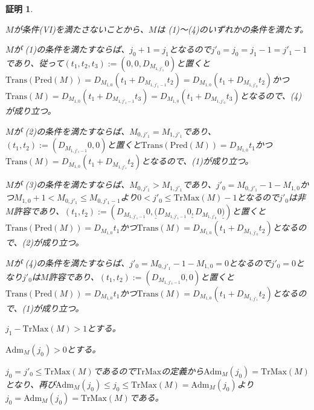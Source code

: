 \documentclass[dvipdfmx,uplatex]{jsarticle}
\theoremstyle{customnonumberbreakfortheorem}
\theoremstyle{customnonumberbreakforproof}
\newtheorem{hideableproof}{証明}
\begin{document}
\begin{hideableproof}
\begin{indented}
\begin{indented}
			\item \(M\)が条件(VI)を満たさないことから、\(M\)は (1)～(4)のいずれかの条件を満たす。
			\item \(M\)が (1)の条件を満たすならば、\(j_0+1 = j_1\)となるので\(j'_0 = j_0 = j_1-1 = j'_1-1\)であり、従って\((t_1,t_2,t_3) := (0,0,D_{M_{1,j'_1}} 0)\)と置くと\(\textrm{Trans}(\textrm{Pred}(M)) = D_{M_{1,0}}(t_1 + D_{M_{1,j'_1-1}} t_2) = D_{M_{1,0}}(t_1 + D_{M_{1,j'_0}} t_2)\)かつ\(\textrm{Trans}(M) = D_{M_{1,0}}(t_1 + D_{M_{1,j'_1-1}} t_3) = D_{M_{1,0}}(t_1 + D_{M_{1,j'_0}} t_3)\)となるので、(4)が成り立つ。
			\item \(M\)が (2)の条件を満たすならば、\(M_{0,j'_1} = M_{1,j'_1}\)であり、\((t_1,t_2) := (D_{M_{1,j'_1-1}} 0, 0)\)と置くと\(\textrm{Trans}(\textrm{Pred}(M)) = D_{M_{1,0}} t_1\)かつ\(\textrm{Trans}(M) = D_{M_{1,0}}(t_1 + D_{M_{1,j'_1}} t_2)\)となるので、(1)が成り立つ。
			\item \(M\)が (3)の条件を満たすならば、\(M_{0,j'_1} > M_{1,j'_1}\)であり、\(j'_0 = M_{0,j'_1}-1-M_{1,0}\)かつ\(M_{1,0}+1 < M_{0,j'_1} \leq M_{0,j'_1-1}\)より\(0 < j'_0 \leq \textrm{TrMax}(M)-1\)となるので\(j'_0\)は非\(M\)許容であり、\((t_1,t_2) := (D_{M_{1,j'_1-1}} 0, \underline{(} D_{M_{1,j'_1-1}} 0 \underline{,} D_{M_{1,j'_0}} 0 \underline{)})\)と置くと\(\textrm{Trans}(\textrm{Pred}(M)) = D_{M_{1,0}} t_1\)かつ\(\textrm{Trans}(M) = D_{M_{1,0}}(t_1 + D_{M_{1,j'_0}} t_2)\)となるので、(2)が成り立つ。
			\item \(M\)が (4)の条件を満たすならば、\(j'_0 = M_{0,j'_1}-1-M_{1,0} = 0\)となるので\(j'_0 = 0\)となり\(j'_0\)は\(M\)許容であり、\((t_1,t_2) := (D_{M_{1,j'_1-1}} 0, 0)\)と置くと\(\textrm{Trans}(\textrm{Pred}(M)) = D_{M_{1,0}} t_1\)かつ\(\textrm{Trans}(M) = D_{M_{1,0}}(t_1 + D_{M_{1,j'_1}} t_2)\)となるので、(1)が成り立つ。
		\end{indented}
		\item \(j_1 - \textrm{TrMax}(M) > 1\)とする。
		\begin{indented}
			\item \(\textrm{Adm}_M(j_0) > 0\)とする。
			\begin{indented}
				\item \(j_0 = j'_0 \leq \textrm{TrMax}(M)\)であるので\(\textrm{TrMax}\)の定義から\(\textrm{Adm}_M(j_0) = \textrm{TrMax}(M)\)となり、再び\(\textrm{Adm}_M(j_0) \leq j_0 \leq \textrm{TrMax}(M) = \textrm{Adm}_M(j_0)\)より\(j_0 = \textrm{Adm}_M(j_0) = \textrm{TrMax}(M)\)である。

\end{indented}
\end{indented}
\end{indented}
\end{hideableproof}
\end{document}
